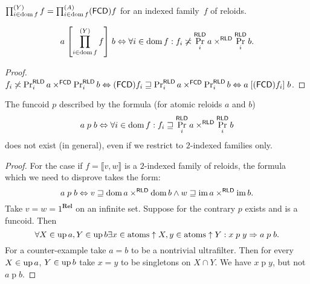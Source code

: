 
\begin{defn}
  $\prod^{(Y)}_{i \in \operatorname{dom} f} f = \prod^{(A)}_{i \in \operatorname{dom} f}
  (\mathsf{FCD}) f$ for an indexed family~$f$ of reloids.
\end{defn}

\begin{prop}
  \[ a \mathrel{\left[ \prod^{(Y)}_{i \in \operatorname{dom} f} f \right]} b
  \Leftrightarrow \forall i \in \operatorname{dom} f : f_i \not\asymp
  \Pr^{\mathsf{RLD}}_i a \times^{\mathsf{RLD}}
  \Pr^{\mathsf{RLD}}_i b. \]
\end{prop}

\begin{proof}
  $f_i \not\asymp \Pr^{\mathsf{RLD}}_i a \times^{\mathsf{FCD}} \Pr^{\mathsf{RLD}}_i b
  \Leftrightarrow (\mathsf{FCD}) f_i \sqsupseteq
  \Pr^{\mathsf{RLD}}_i a \times^{\mathsf{FCD}} \Pr^{\mathsf{RLD}}_i b \Leftrightarrow
  a \mathrel{[(\mathsf{FCD}) f_i]} b$.
\end{proof}

\begin{example}
  The funcoid $p$ described by the formula (for atomic reloids $a$ and $b$)
  \[ a \mathrel{\mathrel{p}} b \Leftrightarrow \forall i \in \operatorname{dom} f : f_i
     \sqsupseteq \Pr^{\mathsf{RLD}}_i a \times^{\mathsf{RLD}}
     \Pr^{\mathsf{RLD}}_i b \]
  does not exist (in general), even if we restrict to $2$-indexed families
  only.
\end{example}

\begin{proof}
  For the case if $f = \llbracket v , w \rrbracket$ is a $2$-indexed family of
  reloids, the formula which we need to disprove takes the form:
  \[ a \mathrel{\mathrel{p}} b \Leftrightarrow v \sqsupseteq \operatorname{dom} a
     \times^{\mathsf{RLD}} \operatorname{dom} b \wedge w \sqsupseteq \operatorname{im}
     a \times^{\mathsf{RLD}} \operatorname{im} b. \]
  Take $v = w = 1^{\mathbf{Rel}}$ on an infinite set. Suppose for the
  contrary $p$ exists and is a funcoid. Then
  \[ \forall X \in \operatorname{up} a, Y \in \operatorname{up} b \exists x \in \operatorname{atoms}
     \uparrow X, y \in \operatorname{atoms} \uparrow Y : x \mathrel{\mathrel{p}} y \Rightarrow
     a \mathrel{\mathrel{p}} b. \]
  For a counter-example take $a = b$ to be a nontrivial ultrafilter. Then for
  every $X \in \operatorname{up} a$, $Y \in \operatorname{up} b$ take $x = y$ to be singletons
  on $X \cap Y$. We have $x \mathrel{\mathrel{p}} y$, but not $a \mathrel{\mathrel{p}} b$.
\end{proof}